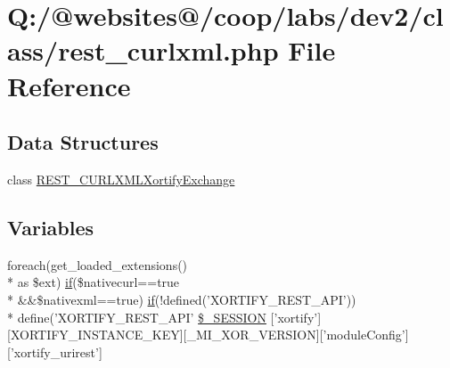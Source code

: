 \hypertarget{rest__curlxml_8php}{\section{Q\-:/@websites@/coop/labs/dev2/class/rest\-\_\-curlxml.php File Reference}
\label{rest__curlxml_8php}
}
\subsection*{Data Structures}
\begin{DoxyCompactItemize}
\item 
class \hyperlink{class_r_e_s_t___c_u_r_l_x_m_l_xortify_exchange}{R\-E\-S\-T\-\_\-\-C\-U\-R\-L\-X\-M\-L\-Xortify\-Exchange}
\end{DoxyCompactItemize}
\subsection*{Variables}
\begin{DoxyCompactItemize}
\item 
foreach(get\-\_\-loaded\-\_\-extensions() \\*
as \$ext) \hyperlink{index_8php_ae2ccdf355624402b65fc2226f2a661cd}{if}(\$nativecurl==true \\*
\&\&\$nativexml==true) \hyperlink{index_8php_ae2ccdf355624402b65fc2226f2a661cd}{if}(!defined('X\-O\-R\-T\-I\-F\-Y\-\_\-\-R\-E\-S\-T\-\_\-\-A\-P\-I')) \\*
define('X\-O\-R\-T\-I\-F\-Y\-\_\-\-R\-E\-S\-T\-\_\-\-A\-P\-I' \hyperlink{rest__curlxml_8php_a30be1d56d79c6bb195242bbf90c1ecfe}{\$\-\_\-\-S\-E\-S\-S\-I\-O\-N} \mbox{[}'xortify'\mbox{]}\mbox{[}X\-O\-R\-T\-I\-F\-Y\-\_\-\-I\-N\-S\-T\-A\-N\-C\-E\-\_\-\-K\-E\-Y\mbox{]}\mbox{[}\-\_\-\-M\-I\-\_\-\-X\-O\-R\-\_\-\-V\-E\-R\-S\-I\-O\-N\mbox{]}\mbox{[}'module\-Config'\mbox{]}\mbox{[}'xortify\-\_\-urirest'\mbox{]}
\end{DoxyCompactItemize}


